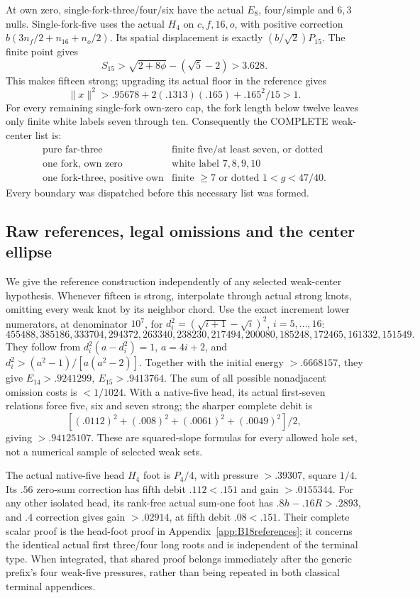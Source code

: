 \documentclass[11pt]{article}
\theoremstyle{definition}
\theoremstyle{remark}
\newcommand{\norm}[1]{\lVert #1\rVert}
\begin{document}
At own zero, single-fork-three/four/six have the actual \(E_8\),
four/simple and \(6,3\) nulls. Single-fork-five uses the actual
\(H_4\) on \(c,f,16,o\), with positive correction
\(b(3n_f/2+n_{16}+n_o/2)\).
Its spatial displacement is exactly \((b/\sqrt2)P_{15}\).
The finite point gives
\[
 S_{15}>\sqrt{2+8\phi}-(\sqrt5-2)>3.628 .
\]
This makes fifteen strong; upgrading its actual floor in the reference
gives
\[
 \norm x^2>.95678+2(.1313)(.165)+.165^2/15>1 .
\]
For every remaining single-fork own-zero cap, the fork length below
twelve leaves only finite white labels seven through ten.
Consequently the COMPLETE weak-center list is:
\[
 \begin{array}{c|c}
 \text{pure far-three}&\text{finite five/at least seven, or dotted}\\
 \text{one fork, own zero}&\text{white label }7,8,9,10\\
 \text{one fork-three, positive own}&\text{finite }\geq7
                         \text{ or dotted }1<g<47/40 .
 \end{array}
\]
Every boundary was dispatched before this necessary list was formed.

\subsection{Raw references, legal omissions and the center ellipse}
\label{app:D18rawreferences}
We give the reference construction independently of any selected
weak-center hypothesis. Whenever fifteen is strong, interpolate through
actual strong knots, omitting every weak knot by its neighbor chord.
Use the exact increment lower numerators, at denominator \(10^7\),
for \(d_i^2=(\sqrt{i+1}-\sqrt i)^2\), \(i=5,\ldots,16\):
\[
455488,385186,333704,294372,263340,238230,
217494,200080,185248,172465,161332,151549 .
\]
They follow from \(d_i^2(a-d_i^2)=1\), \(a=4i+2\), and
\(d_i^2>(a^2-1)/[a(a^2-2)]\).
Together with the initial energy \(>.6668157\), they give
\(E_{14}>.9241299,\ E_{15}>.9413764\).
The sum of all possible nonadjacent omission costs is \(<1/1024\).
With a native-five head, its actual first-seven relations force
five, six and seven strong; the sharper complete debit is
\[
 [(.0112)^2+(.008)^2+(.0061)^2+(.0049)^2]/2 ,
\]
giving \(>.94125107\).
These are squared-slope formulas for every allowed hole set,
not a numerical sample of selected weak sets.

The actual native-five head \(H_4\) foot is \(P_4/4\), with
pressure \(>.39307\), square \(1/4\).
Its \(.56\) zero-sum correction has fifth debit \(.112<.151\)
and gain \(>.0155344\).
For any other isolated head, its rank-free actual sum-one foot
has \(.8h-.16R>.2893\), and \(.4\) correction gives
gain \(>.02914\), at fifth debit \(.08<.151\).
Their complete scalar proof is the head-foot proof in
Appendix~\ref{app:B18references}; it concerns the identical actual
first three/four long roots and is independent of the terminal type.
When integrated, that shared proof belongs immediately after the generic
prefix's four weak-five pressures, rather than being repeated in both
classical terminal appendices.
\end{document}
